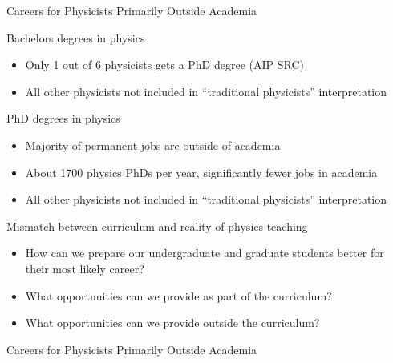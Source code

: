 \documentclass[xcolor={dvipsnames},professionalfonts]{beamer}
\begin{document}
\begin{frame}{Careers for Physicists Primarily Outside Academia}
 \begin{block}{Bachelors degrees in physics}
  \begin{itemize}
   \item Only 1 out of 6 physicists gets a PhD degree (AIP SRC)
   \item All other physicists not included in ``traditional physicists'' interpretation
  \end{itemize}
 \end{block}
 \begin{block}{PhD degrees in physics}
  \begin{itemize}
   \item Majority of permanent jobs are outside of academia
   \item About 1700 physics PhDs per year, significantly fewer jobs in academia
   \item All other physicists not included in ``traditional physicists'' interpretation
  \end{itemize}
 \end{block}
 \begin{block}{Mismatch between curriculum and reality of physics teaching}
  \begin{itemize}
   \item How can we prepare our undergraduate and graduate students better for their most likely career?
   \item What opportunities can we provide as part of the curriculum?
   \item What opportunities can we provide outside the curriculum?
  \end{itemize}
 \end{block}
\end{frame}

\begin{frame}{Careers for Physicists Primarily Outside Academia}
 \begin{columns}[t]
  \begin{column}{0.49\textwidth}
  \end{column}
  \begin{column}{0.49\textwidth}
  \end{column}
 \end{columns}
\end{frame}
\end{document}
